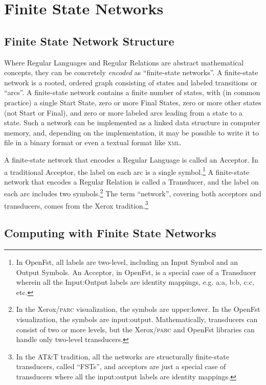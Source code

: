 \documentclass[letterpaper,12pt]{article}
\providecommand{\acro}{}\renewcommand{\acro}{\textsc}
\begin{document}
\section{Finite State Networks}

\subsection{Finite State Network Structure}

Where Regular Languages and Regular Relations are abstract mathematical concepts, they can be
concretely \emph{encoded} as ``finite-state networks''.  A finite-state network is a rooted, ordered graph
consisting of states and labeled transitions or ``arcs''.  A finite-state network contains a finite
number of states, with (in common practice) a single Start State, zero or more Final States, zero
or more other states (not Start or Final), and zero or more labeled arcs leading from a state to a state.  
Such a network can be implemented as a linked data
structure in computer memory, and, depending on the implementation, it may be possible to write it to
file in a binary format or even a textual format like \acro{xml}.

A finite-state network that encodes a Regular Language is called an Acceptor.  In a traditional
Acceptor, the label on each arc is a single symbol.\footnote{In OpenFst, all labels are
two-level, including an Input Symbol and an Output Symbols.  An Acceptor, in OpenFst, is a
special case of a Transducer wherein all the Input:Output labels are identity mappings, e.g.\@
a:a, b:b, c:c, etc.}  A finite-state network
that encodes a Regular Relation is called a Transducer, and the label on each arc includes two
symbols.\footnote{In the Xerox/\acro{parc} visualization, the symbols are upper:lower.  In the
OpenFst visualization, the symbols are input:output.  Mathematically, transducers can consist of
two or more levels, but the Xerox/\acro{parc} and OpenFst libraries can handle only two-level
transducers.}  The term ``network'', covering both acceptors
and transducers, comes from the Xerox tradition.\footnote{In the AT\&T tradition, all the networks are
structurally finite-state transducers, called ``FSTs'', and acceptors are just a special case of transducers
where all the input:output labels are identity mappings.}

\subsection{Computing with Finite State Networks}
\end{document}

